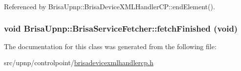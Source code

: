 Referenced by BrisaUpnp::BrisaDeviceXMLHandlerCP::endElement().\hypertarget{classBrisaUpnp_1_1BrisaServiceFetcher_a042c718c5a096a861c1a6a9cd68233ed}{
\subsubsection[{fetchFinished}]{\setlength{\rightskip}{0pt plus 5cm}void BrisaUpnp::BrisaServiceFetcher::fetchFinished (void)}}
\label{classBrisaUpnp_1_1BrisaServiceFetcher_a042c718c5a096a861c1a6a9cd68233ed}


The documentation for this class was generated from the following file:\begin{DoxyCompactItemize}
\item 
src/upnp/controlpoint/\hyperlink{brisadevicexmlhandlercp_8h}{brisadevicexmlhandlercp.h}\end{DoxyCompactItemize}
